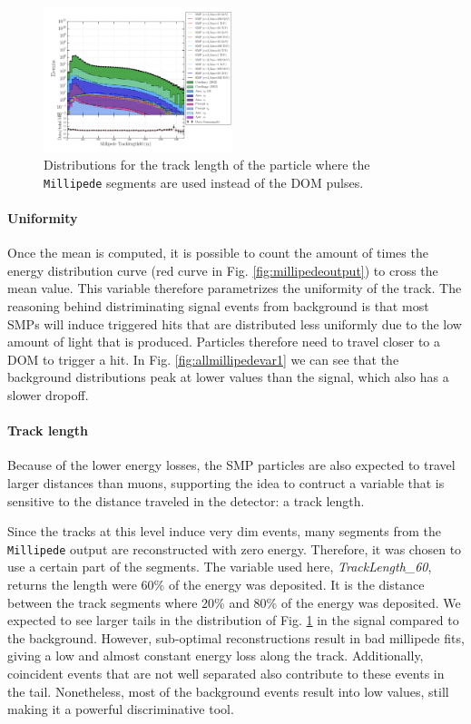 \begin{figure}
\centering
\includegraphics[width=0.49\textwidth]{chapter8/img/1D_stack_millipede_tracklength60.png}
\caption{Distributions for the track length of the particle where the \texttt{Millipede} segments are used instead of the DOM pulses.}
\label{fig:allmillipedevar2}
\end{figure}

\paragraph{Uniformity}
Once the mean is computed, it is possible to count the amount of times the energy distribution curve (red curve in Fig. \ref{fig:millipedeoutput}) to cross the mean value. This variable therefore parametrizes the uniformity of the track. The reasoning behind distriminating signal events from background is that most SMPs will induce triggered hits that are distributed less uniformly due to the low amount of light that is produced. Particles therefore need to travel closer to a DOM to trigger a hit. In Fig. \ref{fig:allmillipedevar1} we can see that the background distributions peak at lower values than the signal, which also has a slower dropoff. 

\paragraph{Track length}
Because of the lower energy losses, the SMP particles are also expected to travel larger distances than muons, supporting the idea to contruct a variable that is sensitive to the distance traveled in the detector: a track length.

Since the tracks at this level induce very dim events, many segments from the \texttt{Millipede} output are reconstructed with zero energy. Therefore, it was chosen to use a certain part of the segments. The variable used here, \textit{TrackLength\_60}, returns the length were 60\% of the energy was deposited. It is the distance between the track segments where 20\% and 80\% of the energy was deposited. We expected to see larger tails in the distribution of Fig. \ref{fig:allmillipedevar2} in the signal compared to the background. However, sub-optimal reconstructions result in bad millipede fits, giving a low and almost constant energy loss along the track. Additionally, coincident events that are not well separated also contribute to these events in the tail. Nonetheless, most of the background events result into low values, still making it a powerful discriminative tool. 

